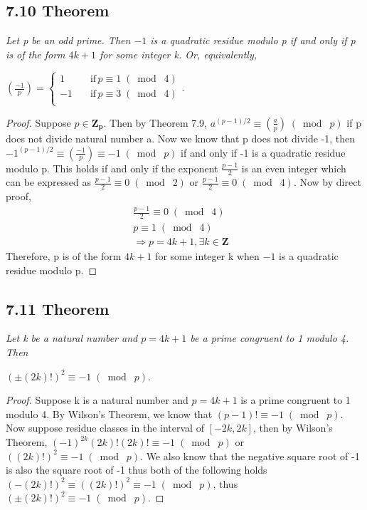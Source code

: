 \documentclass{article}
\begin{document}
\subsection*{7.10 Theorem} 
\quad \textit{Let p be an odd prime. Then $-1$ is a quadratic residue modulo p if and only if p is of the form $4k+1$ for some integer k. Or, equivalently,}
\begin{center}
    $(\frac{-1}{p}) = \begin{cases}
          1 \quad &\text{if} \, p \equiv 1 \;(\bmod\; 4)\\
          -1 \quad &\text{if} \, p \equiv 3 \;(\bmod\; 4)\\
     \end{cases}$.
\end{center}

\begin{proof}
Suppose $p \in \mathbf{Z_p}$. Then by Theorem 7.9, $a^{(p-1)/2} \equiv (\frac{a}{p}) \;(\bmod\; p)$ if p does not divide natural number a. Now we know that p does not divide -1, then $-1^{(p-1)/2} \equiv (\frac{-1}{p}) \equiv -1 \;(\bmod\; p)$ if and only if -1 is a quadratic residue modulo p. This holds if and only if the exponent $\frac{p-1}{2}$ is an even integer which can be expressed as $\frac{p-1}{2} \equiv 0 \;(\bmod\; 2)$ or $\frac{p-1}{2} \equiv 0 \;(\bmod\; 4)$. Now by direct proof,
\begin{align*}
    &\frac{p-1}{2} \equiv 0 \;(\bmod\; 4) &\\
    &p \equiv 1 \;(\bmod\; 4) &\\
    &\Longrightarrow p = 4k + 1, \exists k \in \mathbf{Z}&&
\end{align*}
Therefore, p is of the form $4k+1$ for some integer k when $-1$ is a quadratic residue modulo p.
\end{proof}

\subsection*{7.11 Theorem} 
\quad \textit{Let k be a natural number and $p = 4k+1$ be a prime congruent to 1 modulo 4. Then}
\begin{center}
    $(\pm(2k)!)^2 \equiv -1 \;(\bmod\; p)$.
\end{center}

\begin{proof}
Suppose k is a natural number and $p = 4k+1$ is a prime congruent to 1 modulo 4. By Wilson's Theorem, we know that $(p-1)! \equiv -1 \;(\bmod\; p)$. Now suppose residue classes in the interval of $[-2k, 2k]$, then by Wilson's Theorem, $(-1)^{2k}(2k)!(2k)! \equiv -1 \;(\bmod\; p)$ or $((2k)!)^2 \equiv -1 \;(\bmod\; p)$. We also know that the negative square root of -1 is also the square root of -1 thus both of the following holds $(-(2k)!)^2 \equiv ((2k)!)^2 \equiv -1 \;(\bmod\; p)$, thus $(\pm(2k)!)^2 \equiv -1 \;(\bmod\; p)$.
\end{proof}
\end{document}
